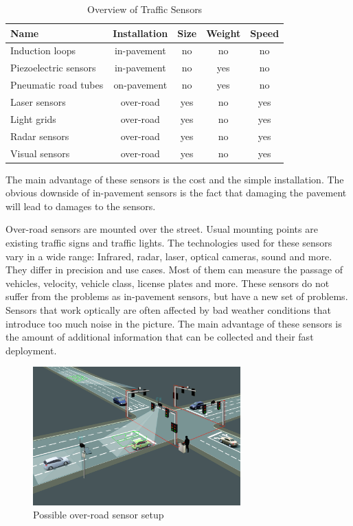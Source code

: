\begin{table}[hb!]
	\centering
	\begin{tabular}{l|c|c|c|c}
		Name & Installation & Size & Weight & Speed \\
		\hline\hline
		Induction loops & in-pavement & no & no & no \\
		Piezoelectric sensors & in-pavement & no & yes & no \\
		Pneumatic road tubes & on-pavement & no & yes & no \\
		Laser sensors & over-road & yes & no & yes \\
		Light grids & over-road & yes & no & yes \\
		Radar sensors & over-road & yes & no & yes \\
		Visual sensors & over-road & yes & no & yes \\
	\end{tabular}
	\caption{Overview of Traffic Sensors}
	\label{sensor_overview}
\end{table}

The main advantage of these sensors is the cost and the simple installation. The obvious downside of in-pavement sensors is the fact that damaging the pavement will lead to damages to the sensors.

Over-road sensors are mounted over the street. Usual mounting points are existing traffic signs and traffic lights. The technologies used for these sensors vary in a wide range: Infrared, radar, laser, optical cameras, sound and more. They differ in precision and use cases. Most of them can measure the passage of vehicles, velocity, vehicle class, license plates and more. These sensors do not suffer from the problems as in-pavement sensors, but have a new set of problems. Sensors that work optically are often affected by bad weather conditions that introduce too much noise in the picture. The main advantage of these sensors is the amount of additional information that can be collected and their fast deployment. \cite{tdh}

\begin{figure}[ht]
	\centering
	\includegraphics[width=8cm]{figures/overroad-sensor}
	\caption[Possible Over-Road Sensor Setup]{Possible over-road sensor setup\protect\footnotemark}
	\label{overroad-sensor}
\end{figure}


